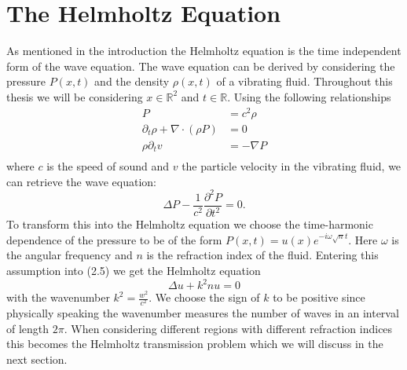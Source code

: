 \documentclass[a4paper, oneside]{thirdparty_stylesheets/discothesis}
\begin{document}
\section{The Helmholtz Equation}
As mentioned in the introduction the Helmholtz equation is the time independent form of the wave equation. 
The wave equation can be derived by considering the pressure $P(x,t)$ and the density $\rho(x,t)$ of a vibrating fluid.
Throughout this thesis we will be considering $x \in \mathbb{R}^2$ and $t \in \mathbb{R}$.
Using the following relationships
\begin{align}
	P &= c^2 \rho \\
	\partial_t \rho + \nabla \cdot (\rho P) &= 0 \\
	\rho \partial_t v &= -\nabla P \\
\end{align}
where $c$ is the speed of sound and $v$ the particle velocity in the vibrating fluid,
we can retrieve the wave equation:
\begin{equation}
	\Delta P - \frac{1}{c^2} \frac{\partial^2 P}{\partial t^2} = 0 .
\end{equation}
To transform this into the Helmholtz equation we choose the time-harmonic dependence of the pressure to be of the form $P(x,t) = u(x)e^{-i\omega \sqrt{n} t}$. 
Here $\omega$ is the angular frequency and $n$ is the refraction index of the fluid.
Entering this assumption into (2.5) we get the Helmholtz equation 
\begin{equation}
	\Delta u + k^2nu = 0
\end{equation}
with the wavenumber $k^2=\frac{w^2}{c^2}$. 
We choose the sign of $k$ to be positive since physically speaking the wavenumber measures the number of waves in an interval of length $2\pi$.
When considering different regions with different refraction indices this becomes the Helmholtz transmission problem which we will discuss in the next section.
\end{document}
